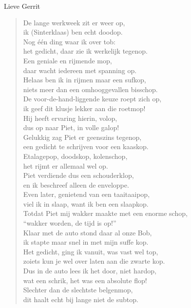 \documentclass[12pt]{brief}
\date{3 december 2006}
\begin{document}
\begin{letter}{Lieve Gerrit}

\opening{}


\begin{verse}

De lange werkweek zit er weer op,\\
ik (Sinterklaas) ben echt doodop.\\
Nog \'e\'en ding waar ik over tob:\\
het gedicht, daar zie ik werkelijk tegenop.\\
Een geniale en rijmende mop,\\
daar wacht iedereen met spanning op.\\[0.5em]

Helaas ben ik in rijmen maar een sufkop,\\
niets meer dan een omhooggevallen bisschop.\\
De voor-de-hand-liggende keuze roept zich op,\\
ik geef dit klusje lekker aan die roetmop!\\
Hij heeft ervaring hierin, volop,\\
dus op naar Piet, in volle galop!\\[1.5em]

Gelukkig zag Piet er geenszins tegenop,\\
een gedicht te schrijven voor een kaaskop.\\
Etalagepop, doodskop, kolenschop,\\
het rijmt er allemaal wel op.\\[0.5em]

Piet verdiende dus een schouderklop,\\
en ik beschreef alleen de enveloppe.\\[1.5em]

Even later, genietend van een taaitaaipop,\\
viel ik in slaap, want ik ben een slaapkop.\\[0.5em]

Totdat Piet mij wakker maakte met een enorme schop,\\
``wakker worden, de tijd is op!''\\
Klaar met de auto stond daar al onze Bob,\\
ik stapte maar snel in met mijn suffe kop.\\[0.5em]

Het gedicht, ging ik vanuit, was vast wel top,\\
zoiets kun je wel over laten aan die zwarte kop.\\
Dus in de auto lees ik het door, niet hardop,\\
wat een schrik, het was een absolute flop!\\
Slechter dan de slechtste belgenmop,\\
dit haalt echt bij lange niet de subtop.\\[0.5em]


\end{verse}
\end{letter}
\end{document}
